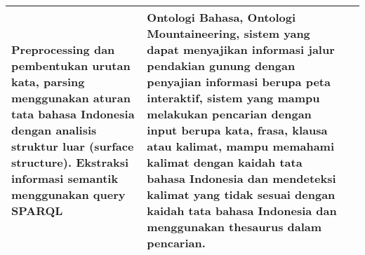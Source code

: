 \begin{table}[]
\begin{tabular}{| p{1cm} | p{5.5cm} | p{6cm} |}
\multicolumn{1}{p{6cm}|}{Preprocessing dan pembentukan urutan kata, parsing menggunakan aturan tata bahasa Indonesia dengan analisis struktur luar (surface structure). Ekstraksi informasi semantik menggunakan query SPARQL} & 
\multicolumn{1}{p{6cm}|}{Ontologi Bahasa, Ontologi Mountaineering, sistem yang dapat menyajikan informasi jalur pendakian gunung dengan penyajian informasi berupa peta interaktif, sistem yang mampu melakukan pencarian dengan input berupa kata, frasa, klausa atau kalimat, mampu memahami kalimat dengan kaidah tata bahasa Indonesia dan mendeteksi kalimat yang tidak sesuai dengan kaidah tata bahasa Indonesia dan menggunakan thesaurus dalam pencarian.} \\ \hline
\end{tabular}
\end{table}

\begin{comment}

\end{comment}
